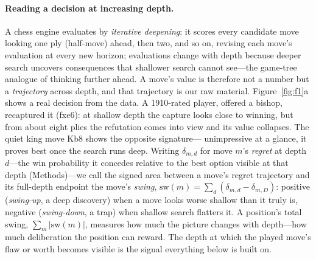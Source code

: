 \paragraph{Reading a decision at increasing depth.}
A chess engine evaluates by \emph{iterative deepening}: it scores every candidate move
looking one ply (half-move) ahead, then two, and so on, revising each move's evaluation at
every new horizon; evaluations change with depth because deeper search uncovers consequences
that shallower search cannot see---the game-tree analogue of thinking further ahead. A
move's value is therefore not a number but a \emph{trajectory} across
depth, and that trajectory is our raw material. Figure~\ref{fig:f1}a shows a real decision
from the data. A 1910-rated player, offered a bishop, recaptured it (fxe6): at shallow depth
the capture looks close to winning, but from about eight plies the refutation comes into
view and its value collapses. The quiet king move Kb8 shows the opposite signature---
unimpressive at a glance, it proves best once the search runs deep. Writing $\delta_{m,d}$
for move $m$'s \emph{regret} at depth $d$---the win probability it concedes relative to the
best option visible at that depth (Methods)---we call the signed area
between a move's regret trajectory and its full-depth endpoint the move's \emph{swing},
$\mathrm{sw}(m)=\sum_d\!\left(\delta_{m,d}-\delta_{m,D}\right)$: positive
(\emph{swing-up}, a deep discovery) when a move looks worse shallow than it truly is, negative
(\emph{swing-down}, a trap) when shallow search flatters it. A position's total swing,
$\sum_m\lvert\mathrm{sw}(m)\rvert$, measures how much the picture changes with depth---how
much deliberation the position can reward. The depth at which the played move's flaw or worth
becomes visible is the signal everything below is built on.

